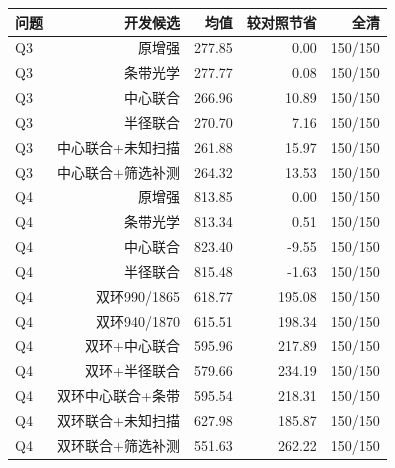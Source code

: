 \begin{tabular}{lrrrr}
\toprule
问题 & 开发候选 & 均值 & 较对照节省 & 全清 \\
\midrule
Q3 & 原增强 & 277.85 & 0.00 & 150/150 \\
Q3 & 条带光学 & 277.77 & 0.08 & 150/150 \\
Q3 & 中心联合 & 266.96 & 10.89 & 150/150 \\
Q3 & 半径联合 & 270.70 & 7.16 & 150/150 \\
Q3 & 中心联合+未知扫描 & 261.88 & 15.97 & 150/150 \\
Q3 & 中心联合+筛选补测 & 264.32 & 13.53 & 150/150 \\
Q4 & 原增强 & 813.85 & 0.00 & 150/150 \\
Q4 & 条带光学 & 813.34 & 0.51 & 150/150 \\
Q4 & 中心联合 & 823.40 & -9.55 & 150/150 \\
Q4 & 半径联合 & 815.48 & -1.63 & 150/150 \\
Q4 & 双环990/1865 & 618.77 & 195.08 & 150/150 \\
Q4 & 双环940/1870 & 615.51 & 198.34 & 150/150 \\
Q4 & 双环+中心联合 & 595.96 & 217.89 & 150/150 \\
Q4 & 双环+半径联合 & 579.66 & 234.19 & 150/150 \\
Q4 & 双环中心联合+条带 & 595.54 & 218.31 & 150/150 \\
Q4 & 双环联合+未知扫描 & 627.98 & 185.87 & 150/150 \\
Q4 & 双环联合+筛选补测 & 551.63 & 262.22 & 150/150 \\
\bottomrule
\end{tabular}
